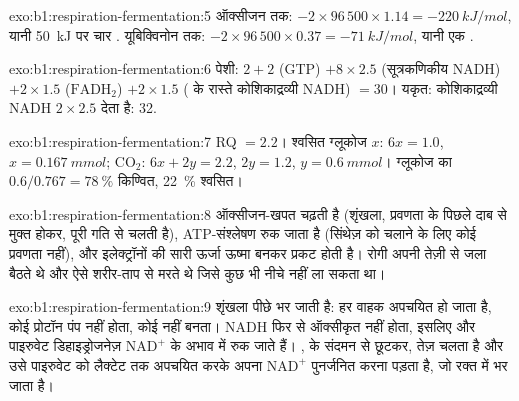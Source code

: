 \begin{solution}{exo:b1:respiration-fermentation:5}
ऑक्सीजन तक: $-2\times 96\,500\times 1.14 = \qty{-220}{kJ/mol}$, यानी
\qty{50}{kJ} पर चार . यूबिक्विनोन तक: $-2\times 96\,500\times 0.37 =
\qty{-71}{kJ/mol}$, यानी एक .
\end{solution}

\begin{solution}{exo:b1:respiration-fermentation:6}
पेशी: $2 + 2$ (GTP) $+ 8\times 2.5$ (सूत्रकणिकीय NADH) $+ 2\times
1.5$ ($\mathrm{FADH_2}$) $+ 2\times 1.5$ ( के रास्ते कोशिकाद्रव्यी NADH) $=
30$। यकृत: कोशिकाद्रव्यी NADH $2\times 2.5$ देता है: 32.
\end{solution}

\begin{solution}{exo:b1:respiration-fermentation:7}
RQ $= 2.2$। श्वसित ग्लूकोज $x$: $6x = 1.0$, $x = \qty{0.167}{mmol}$;
$\mathrm{CO_2}$: $6x + 2y = 2.2$, $2y = 1.2$, $y = \qty{0.6}{mmol}$।
ग्लूकोज का $0.6/0.767 = \qty{78}{\%}$ किण्वित, \qty{22}{\%}
श्वसित।
\end{solution}

\begin{solution}{exo:b1:respiration-fermentation:8}
ऑक्सीजन-खपत चढ़ती है (शृंखला, प्रवणता के पिछले दाब से मुक्त होकर, पूरी
गति से चलती है), ATP-संश्लेषण रुक जाता है (सिंथेज़ को चलाने के लिए कोई
प्रवणता नहीं), और इलेक्ट्रॉनों की सारी ऊर्जा ऊष्मा बनकर प्रकट होती है।
रोगी अपनी  तेज़ी से जला बैठते थे और ऐसे शरीर-ताप से मरते थे जिसे कुछ
भी नीचे नहीं ला सकता था।
\end{solution}

\begin{solution}{exo:b1:respiration-fermentation:9}
शृंखला पीछे भर जाती है: हर वाहक अपचयित हो जाता है, कोई प्रोटॉन पंप नहीं
होता, कोई  नहीं बनता। NADH फिर से ऑक्सीकृत नहीं होता, इसलिए 
और पाइरुवेट डिहाइड्रोजनेज़ $\mathrm{NAD^+}$ के अभाव में रुक जाते हैं।
,  के संदमन से छूटकर, तेज़ चलता है और उसे पाइरुवेट को
लैक्टेट तक अपचयित करके अपना $\mathrm{NAD^+}$ पुनर्जनित करना पड़ता है, जो
रक्त में भर जाता है।
\end{solution}

